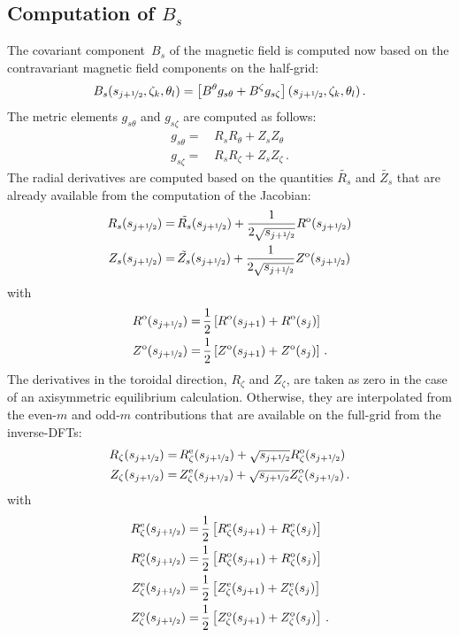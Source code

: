 \subsection{Computation of $B_s$}
The covariant component~$B_s$ of the magnetic field is computed now
based on the contravariant magnetic field components on the half-grid:
\begin{equation}
 B_s(s_{j+\nicefrac{1}{2}}, \zeta_k, \theta_l) = \left[B^\theta g_{s \theta} + B^\zeta g_{s \zeta} \right](s_{j+\nicefrac{1}{2}}, \zeta_k, \theta_l) \, .
\end{equation}
The metric elements $g_{s \theta}$ and $g_{s \zeta}$ are computed as follows:
\begin{align}
 g_{s \theta} =&\, R_s R_\theta + Z_s Z_\theta \\
 g_{s \zeta}  =&\, R_s R_\zeta  + Z_s Z_\zeta  \, .
\end{align}
The radial derivatives are computed based on the quantities $\tilde{R_s}$ and $\tilde{Z_s}$
that are already available from the computation of the Jacobian:
\begin{align}
 R_s(s_{j+\nicefrac{1}{2}}) =&\, \tilde{R_s}(s_{j+\nicefrac{1}{2}}) + \frac{1}{2 \sqrt{s_{j+\nicefrac{1}{2}}}} R^\textrm{o}(s_{j+\nicefrac{1}{2}}) \\
 Z_s(s_{j+\nicefrac{1}{2}}) =&\, \tilde{Z_s}(s_{j+\nicefrac{1}{2}}) + \frac{1}{2 \sqrt{s_{j+\nicefrac{1}{2}}}} Z^\textrm{o}(s_{j+\nicefrac{1}{2}})
\end{align}
with
\begin{align}
 R^\textrm{o}(s_{j+\nicefrac{1}{2}}) =&\, \frac{1}{2} \left[ R^\textrm{o}(s_{j+1}) + R^\textrm{o}(s_j) \right] \\
 Z^\textrm{o}(s_{j+\nicefrac{1}{2}}) =&\, \frac{1}{2} \left[ Z^\textrm{o}(s_{j+1}) + Z^\textrm{o}(s_j) \right] \, .
\end{align}
The derivatives in the toroidal direction, $R_\zeta$ and $Z_\zeta$,
are taken as zero in the case of an axisymmetric equilibrium calculation.
Otherwise, they are interpolated from the even-$m$ and odd-$m$ contributions
that are available on the full-grid from the inverse-DFTs:
\begin{align}
 R_\zeta(s_{j+\nicefrac{1}{2}}) =&\, R_\zeta^\textrm{e}(s_{j+\nicefrac{1}{2}}) + \sqrt{s_{j+\nicefrac{1}{2}}} R_\zeta^\textrm{o}(s_{j+\nicefrac{1}{2}}) \\
 Z_\zeta(s_{j+\nicefrac{1}{2}}) =&\, Z_\zeta^\textrm{e}(s_{j+\nicefrac{1}{2}}) + \sqrt{s_{j+\nicefrac{1}{2}}} Z_\zeta^\textrm{o}(s_{j+\nicefrac{1}{2}}) \, .
\end{align}
with
\begin{align}
 R_\zeta^\textrm{e}(s_{j+\nicefrac{1}{2}}) =&\, \frac{1}{2} \left[ R_\zeta^\textrm{e}(s_{j+1}) + R_\zeta^\textrm{e}(s_j) \right] \\
 R_\zeta^\textrm{o}(s_{j+\nicefrac{1}{2}}) =&\, \frac{1}{2} \left[ R_\zeta^\textrm{o}(s_{j+1}) + R_\zeta^\textrm{o}(s_j) \right] \\
 Z_\zeta^\textrm{e}(s_{j+\nicefrac{1}{2}}) =&\, \frac{1}{2} \left[ Z_\zeta^\textrm{e}(s_{j+1}) + Z_\zeta^\textrm{e}(s_j) \right] \\
 Z_\zeta^\textrm{o}(s_{j+\nicefrac{1}{2}}) =&\, \frac{1}{2} \left[ Z_\zeta^\textrm{o}(s_{j+1}) + Z_\zeta^\textrm{o}(s_j) \right] \, .
\end{align}
